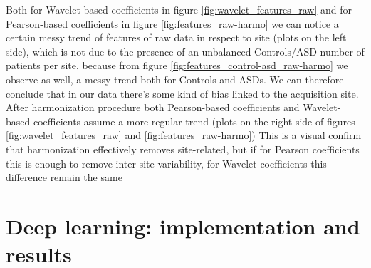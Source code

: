 \documentclass[11pt]{report}
\begin{document}
\hfill

Both for Wavelet-based coefficients in figure \ref{fig:wavelet_features_raw} and for Pearson-based coefficients in figure \ref{fig:features_raw-harmo} we can notice a certain messy trend of features of raw data in respect to site (plots on the left side), which is not due to the presence of an unbalanced Controls/ASD number of patients per site, because from figure \ref{fig:features_control-asd_raw-harmo} we observe as well, a messy trend both for Controls and ASDs.
We can therefore conclude that in our data there's some kind of bias linked to the acquisition site.
After harmonization procedure both Pearson-based coefficients and Wavelet-based coefficients assume a more regular trend (plots on the right side of figures  \ref{fig:wavelet_features_raw} and \ref{fig:features_raw-harmo})
This is a visual confirm that harmonization effectively removes site-related, but if for Pearson coefficients this is enough to remove inter-site variability, for Wavelet coefficients this difference remain the same


%






\newpage
\chapter{Deep learning: implementation and results} \label{sec:deep_learning_results}
\end{document}
